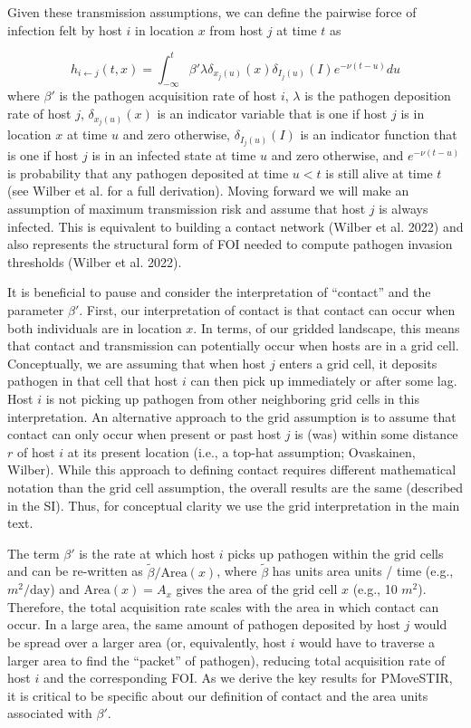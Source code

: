 \documentclass[letterpaper]{article}
\begin{document}
Given these transmission assumptions, we can define the pairwise force of infection felt by host $i$ in location $x$ from host $j$ at time $t$ as \citep{Wilber2022}

\begin{equation}
    h_{i \leftarrow j}(t, x) = \int_{-\infty}^{t} \beta' \lambda \delta_{x_j(u)}(x) \delta_{I_j(u)}(I) e^{-\nu(t - u)} du
    \label{eq:original_foi}
\end{equation}
where $\beta'$ is the pathogen acquisition rate of host $i$, $\lambda$ is the pathogen deposition rate of host $j$, $\delta_{x_j(u)}(x)$ is an indicator variable that is one if host $j$ is in location $x$ at time $u$ and zero otherwise, $\delta_{I_j(u)}(I)$ is an indicator function that is one if host $j$ is in an infected state at time $u$ and zero otherwise, and $e^{-\nu(t - u)}$ is probability that any pathogen deposited at time $u < t$ is still alive at time $t$ (see Wilber et al. for a full derivation).  Moving forward we will make an assumption of maximum transmission risk and assume that host $j$ is always infected. This is equivalent to building a contact network (Wilber et al. 2022) and also represents the structural form of FOI needed to compute pathogen invasion thresholds (Wilber et al. 2022). 

It is beneficial to pause and consider the interpretation of ``contact'' and the parameter $\beta'$.  First, our interpretation of contact is that contact can occur when both individuals are in location $x$.  In terms, of our gridded landscape, this means that contact and transmission can potentially occur when hosts are in a grid cell.  Conceptually, we are assuming that when host $j$ enters a grid cell, it deposits pathogen in that cell that host $i$ can then pick up immediately or after some lag. Host $i$ is not picking up pathogen from other neighboring grid cells in this interpretation.  An alternative approach to the grid assumption is to assume that contact can only occur when present or past host $j$ is (was) within some distance $r$ of host $i$ at its present location (i.e., a top-hat assumption; Ovaskainen, Wilber). While this approach to defining contact requires different mathematical notation than the grid cell assumption, the overall results are the same (described in the SI). Thus, for conceptual clarity we use the grid interpretation in the main text.

The term $\beta'$ is the rate at which host $i$ picks up pathogen within the grid cells and can be re-written as $\tilde{\beta} / \text{Area}(x)$, where $\tilde{\beta}$ has units area units / time (e.g., $m^2 / \text{day}$) and $\text{Area}(x) = A_x$ gives the area of the grid cell $x$ (e.g., 10 $m^2$). Therefore, the total acquisition rate scales with the area in which contact can occur. In a large area, the same amount of pathogen deposited by host $j$ would be spread over a larger area (or, equivalently, host $i$ would have to traverse a larger area to find the ``packet'' of pathogen), reducing total acquisition rate of host $i$ and the corresponding FOI.  As we derive the key results for PMoveSTIR, it is critical to be specific about our definition of contact and the area units associated with $\beta'$.  
\end{document}
